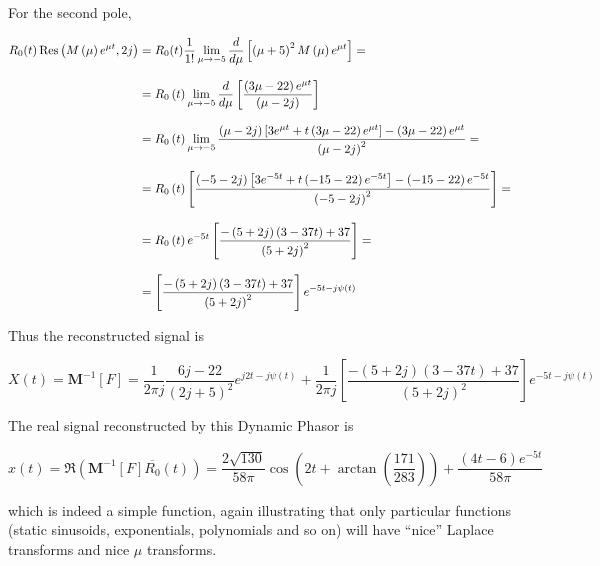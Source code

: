 \begin{example}
	For the second pole,

\begin{align}
	R_0(t) \Res\left(M\left(\mu\right)e^{\mu t},2j\right) &= R_0(t) \dfrac{1}{1!} \lim_{\mu\to -5} \dfrac{d}{d\mu}\left[\left(\mu+5\right)^2 M\left(\mu\right) e^{\mu t}\right] = \nonumber\\[3mm]
%
	&= R_0\left(t\right) \lim_{\mu\to -5} \dfrac{d}{d\mu}\left[\dfrac{\left(3\mu - 22\right)e^{\mu t}}{\left(\mu - 2j\right)}\right] \nonumber\\[3mm]
%
	&= R_0\left(t\right) \lim_{\mu\to -5} \dfrac{\left(\mu - 2j\right)\left[3e^{\mu t} + t\left(3\mu - 22\right)e^{\mu t}\right] - \left(3\mu - 22\right)e^{\mu t}}{\left(\mu - 2j\right)^2} = \nonumber\\[3mm]
%
	&= R_0\left(t\right) \left[\dfrac{\left(-5 - 2j\right)\left[3e^{-5 t} + t\left(-15 - 22\right)e^{-5 t}\right] - \left(-15 - 22\right)e^{-5 t}}{\left(-5 - 2j\right)^2}\right] = \nonumber\\[3mm]
%
	&= R_0\left(t\right)e^{-5t} \left[\dfrac{-\left(5 + 2j\right)\left(3 - 37t\right) + 37}{\left(5 + 2j\right)^2}\right] = \nonumber\\[3mm]
%
	&= \left[\dfrac{-\left(5 + 2j\right)\left(3 - 37t\right) + 37}{\left(5 + 2j\right)^2}\right]e^{-5t - j\psi(t)}
\end{align}

	Thus the reconstructed signal is

\begin{equation} X(t) = \mathbf{M}^{-1}\left[F\right] = \dfrac{1}{2\pi j}\dfrac{6j - 22}{\left(2j + 5\right)^2} e^{j2t - j\psi(t)} + \dfrac{1}{2\pi j}\left[\dfrac{-\left(5 + 2j\right)\left(3 - 37t\right) + 37}{\left(5 + 2j\right)^2}\right]e^{-5t - j\psi(t)} \end{equation}

	The real signal reconstructed by this Dynamic Phasor is

\begin{equation}  x(t) = \Re\left(\mathbf{M}^{-1}\left[F\right]\overline{R_0}(t)\right) = \dfrac{2\sqrt{130}}{58\pi}\cos\left(2t + \arctan\left(\dfrac{171}{283}\right)\right) + \dfrac{\left(4t - 6\right)e^{-5t}}{58\pi} \end{equation}

	\noindent which is indeed a simple function, again illustrating that only particular functions (static sinusoids, exponentials, polynomials and so on) will have ``nice'' Laplace transforms and nice $\mu$ transforms.

\examplebar
\end{example} %

